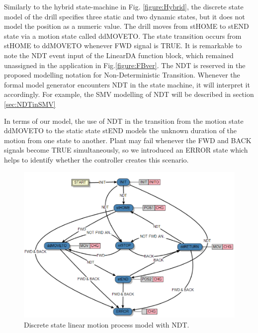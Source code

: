 \begin{bibunit}
Similarly to the hybrid state-machine in Fig. \ref{figure:Hybrid}, the discrete state model of the drill specifies  three static and two dynamic states, but it does not model the position as a numeric value. The drill moves from {stHOME} to {stEND} state via a motion state called {ddMOVETO}. The state transition occurs from stHOME to ddMOVETO whenever FWD signal is TRUE. 
It is remarkable to note the NDT event input of the LinearDA function block, which remained unassigned in the application in Fig.\ref{figure:FBver}.
The NDT is reserved in the proposed modelling notation for Non-Deterministic Transition. 
Whenever the formal model generator encounters NDT in the state machine, it will interpret it accordingly. For example, the SMV modelling of NDT will be described in section \ref{sec:NDTinSMV} 

In terms of our model, the use of NDT in the transition from the motion state {ddMOVETO} to the static state {stEND} models the unknown duration of the motion from one state to another. Plant may fail whenever the {FWD} and {BACK} signals become {TRUE} simultaneously, so we introduced an ERROR state which helps to identify whether the controller creates this scenario.



\begin{figure}
    \centering
    \includegraphics[scale = 0.4]{MX_Papers/Paper2/images/LinearDAFinal.PNG}
    \caption{Discrete state linear motion process model with NDT. }
    \label{figure:DrillECC}
\end{figure}



\end{bibunit}
